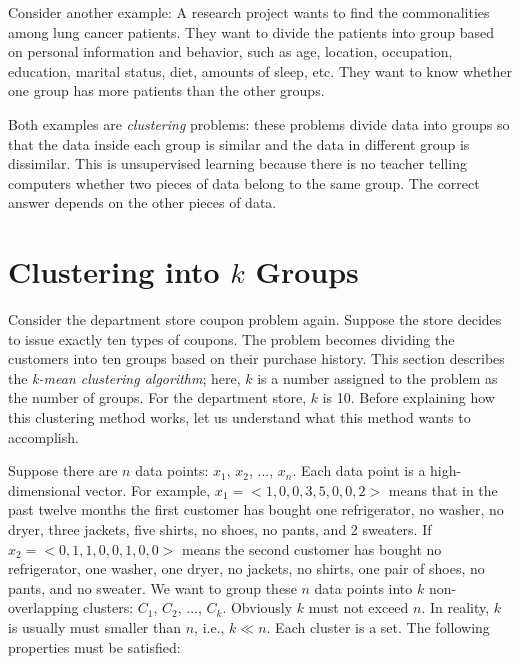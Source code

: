 Consider another example: A research project wants to find the
commonalities among lung cancer patients. They want to divide the
patients into group based on personal information and behavior, such
as age, location, occupation, education, marital status, diet, amounts
of sleep, etc. They want to know whether one group has more patients
than the other groups.

Both examples are {\it clustering} problems: these problems divide
data into groups so that the data inside each group is similar and the
data in different group is dissimilar.  This is unsupervised learning
because there is no teacher telling computers whether two pieces of
data belong to the same group.  The correct answer depends on the
other pieces of data.  

\section{Clustering into $k$ Groups}

Consider the department store coupon problem again. Suppose the store
decides to issue exactly ten types of coupons.  The problem becomes
dividing the customers into ten groups based on their purchase history.
This section describes the {\it k-mean clustering algorithm}; here,
$k$  is a number assigned to
the problem as the number of groups.  For the department store, $k$ is
10.  Before explaining how this clustering method works, let us
understand what this method wants to accomplish.

Suppose there are $n$ data points: $x_1$, $x_2$, ..., $x_n$. Each data
point is a high-dimensional vector.  For example, $x_1 = <1, 0, 0, 3,
5, 0, 0, 2>$ means that in the past twelve months the first customer
has bought one refrigerator, no washer, no dryer, three jackets, five
shirts, no shoes, no pants, and 2 sweaters.  If $x_2 = <0, 1, 1, 0, 0,
1, 0, 0>$ means the second customer has bought no refrigerator, one
washer, one dryer, no jackets, no shirts, one pair of shoes, no pants,
and no sweater.  We want to group these $n$ data points into $k$
non-overlapping clusters: $C_1$, $C_2$, ..., $C_k$. Obviously $k$ must
not exceed $n$. In reality, $k$ is usually must smaller than $n$,
i.e., $k \ll n$.  Each cluster is a set.   The following properties must be
satisfied:

